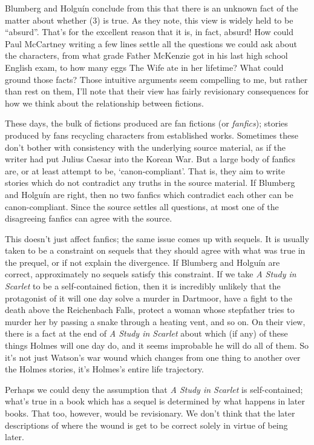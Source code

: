 \documentclass[
  11pt,
  letterpaper,
  DIV=11,
  numbers=noendperiod,
  twoside]{scrartcl}
\begin{document}
Blumberg and Holguín conclude from this that there is an unknown fact of
the matter about whether (3) is true. As they note, this view is widely
held to be ``absurd''. That's for the excellent reason that it is, in
fact, absurd! How could Paul McCartney writing a few lines settle all
the questions we could ask about the characters, from what grade Father
McKenzie got in his last high school English exam, to how many eggs The
Wife ate in her lifetime? What could ground those facts? Those intuitive
arguments seem compelling to me, but rather than rest on them, I'll note
that their view has fairly revisionary consequences for how we think
about the relationship between fictions.

These days, the bulk of fictions produced are fan fictions (or
\emph{fanfics}); stories produced by fans recycling characters from
established works. Sometimes these don't bother with consistency with
the underlying source material, as if the writer had put Julius Caesar
into the Korean War. But a large body of fanfics are, or at least
attempt to be, `canon-compliant'. That is, they aim to write stories
which do not contradict any truths in the source material. If Blumberg
and Holguín are right, then no two fanfics which contradict each other
can be canon-compliant. Since the source settles all questions, at most
one of the disagreeing fanfics can agree with the source.

This doesn't just affect fanfics; the same issue comes up with sequels.
It is usually taken to be a constraint on sequels that they should agree
with what was true in the prequel, or if not explain the divergence. If
Blumberg and Holguín are correct, approximately no sequels satisfy this
constraint. If we take \emph{A Study in Scarlet} to be a self-contained
fiction, then it is incredibly unlikely that the protagonist of it will
one day solve a murder in Dartmoor, have a fight to the death above the
Reichenbach Falls, protect a woman whose stepfather tries to murder her
by passing a snake through a heating vent, and so on. On their view,
there is a fact at the end of \emph{A Study in Scarlet} about which (if
any) of these things Holmes will one day do, and it seems improbable he
will do all of them. So it's not just Watson's war wound which changes
from one thing to another over the Holmes stories, it's Holmes's entire
life trajectory.

Perhaps we could deny the assumption that \emph{A Study in Scarlet} is
self-contained; what's true in a book which has a sequel is determined
by what happens in later books. That too, however, would be revisionary.
We don't think that the later descriptions of where the wound is get to
be correct solely in virtue of being later.
\end{document}
